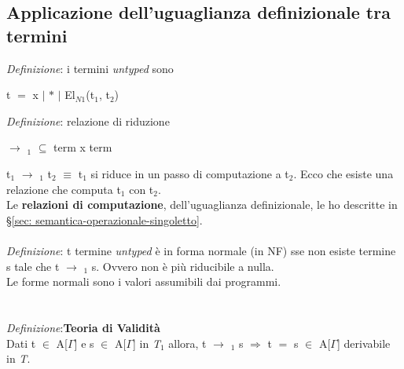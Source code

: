\subsection{Applicazione dell'uguaglianza definizionale tra termini}
\label{subsec: applicazione-uguaglianza-definizionale-tra-termini}
\textit{Definizione}: i termini \textit{untyped} sono
\begin{center}t $=$ x $|$ $\ast$ $|$ El$_{N1}$(t$_1$, t$_2$)\end{center}
\textit{Definizione}: relazione di riduzione
\begin{center}$\rightarrow$ $_1$ $\subseteq$ term x term\end{center}
t$_1$ $\rightarrow$ $_1$ t$_2$ $\equiv$ t$_1$ si riduce in un passo di computazione a t$_2$. Ecco che esiste una relazione che computa t$_1$ con t$_2$.\\
Le \textbf{relazioni di computazione}, dell'uguaglianza definizionale, le ho descritte in \S\ref{sec: semantica-operazionale-singoletto}.
\\\\
\textit{Definizione}: t termine \textit{untyped} \`e in forma normale (in NF) sse non esiste termine s tale che t $\rightarrow$ $_1$ s. Ovvero non \`e pi\`u riducibile a nulla. \\  Le forme normali sono i valori assumibili dai programmi.\\
\\\\
\textit{Definizione}:\textbf{Teoria di Validit\`a}\\ Dati t $\in$ A[$\Gamma$] e s $\in$ A[$\Gamma$] in \textit{T$_1$} allora, t $\rightarrow$ $_1$ s $\Rightarrow$ t $=$ s $\in$ A[$\Gamma$] derivabile in \textit{T}.


